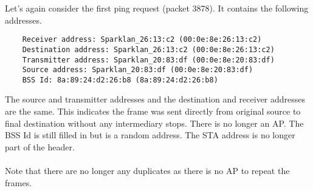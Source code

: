 Let's again consider the first ping request (packet 3878). It contains the following addresses.
\begin{lstlisting}
    Receiver address: Sparklan_26:13:c2 (00:0e:8e:26:13:c2)
    Destination address: Sparklan_26:13:c2 (00:0e:8e:26:13:c2)
    Transmitter address: Sparklan_20:83:df (00:0e:8e:20:83:df)
    Source address: Sparklan_20:83:df (00:0e:8e:20:83:df)
    BSS Id: 8a:89:24:d2:26:b8 (8a:89:24:d2:26:b8)
\end{lstlisting}

The source and transmitter addresses and the destination and receiver addresses are the same. This indicates the frame was sent directly from original source to final destination without any intermediary stops. There is no longer an AP. The BSS Id is still filled in but is a random address. %
The STA address is no longer part of the header. \\ \\
Note that there are no longer any duplicates as there is no AP to repeat the frames.
